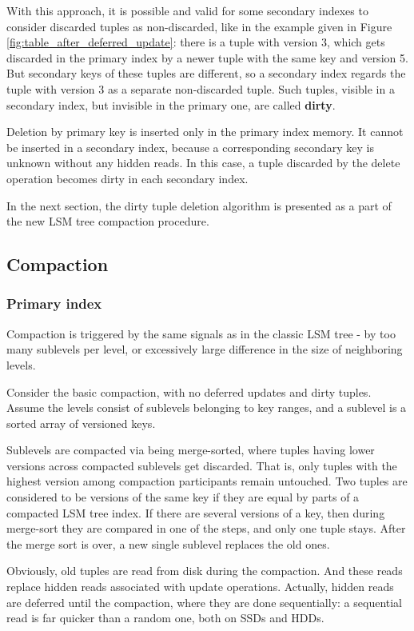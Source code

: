 \documentclass{vldb}
\begin{document}
With this approach, it is possible and valid for some secondary indexes to consider
discarded tuples as non-discarded, like in the example given in Figure
\ref{fig:table_after_deferred_update}: there is a tuple with
version 3, which gets discarded in the primary index by a newer tuple with the same
key and version 5. But secondary keys of these tuples are different, so a
secondary index regards the tuple with version 3 as a separate non-discarded tuple.
Such tuples, visible in a secondary index, but invisible in the primary one, are
called \textbf{dirty}.

Deletion by primary key is inserted only in the primary index memory. It cannot
be inserted in a secondary index, because a corresponding secondary key is
unknown without any hidden reads. In this case, a tuple discarded by the delete
operation becomes dirty in each secondary index.

In the next section, the dirty tuple deletion algorithm is presented as a part of
the new LSM tree compaction procedure.

\subsection{Compaction}
\subsubsection{Primary index}

Compaction is triggered by the same signals as in the classic LSM tree - by
too many sublevels per level, or excessively large difference in the size of
neighboring levels.

Consider the basic compaction, with no deferred updates and dirty tuples.
Assume the levels consist of sublevels belonging to key ranges, and a sublevel
is a sorted array of versioned keys.

Sublevels are compacted via being merge-sorted, where tuples having lower
versions across compacted sublevels get discarded. That is, only tuples with the
highest version among compaction participants remain untouched. Two tuples are considered
to be versions of the same key if they are equal by parts of a compacted LSM tree
index. If there are several versions of a key, then during merge-sort they are compared
in one of the steps, and only one tuple stays. After the merge sort is over,
a new single sublevel replaces the old ones.

Obviously, old tuples are read from disk during the compaction. And these reads
replace hidden reads associated with update operations. Actually, hidden reads are
deferred until the compaction, where they are done sequentially: a sequential read
is far quicker than a random one, both on SSDs and HDDs.
\end{document}
